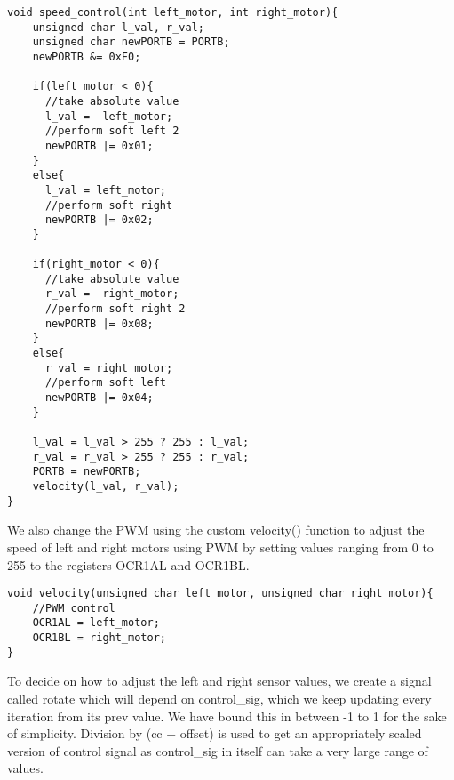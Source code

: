 \documentclass{article}
\begin{document}

\begin{tcolorbox}[title={Code for \texttt{speed\_control()} function}]
\begin{lstlisting}
void speed_control(int left_motor, int right_motor){
    unsigned char l_val, r_val;
    unsigned char newPORTB = PORTB;
    newPORTB &= 0xF0;
    
    if(left_motor < 0){
      //take absolute value
      l_val = -left_motor;
      //perform soft left 2
      newPORTB |= 0x01;
    }
    else{
      l_val = left_motor;
      //perform soft right
      newPORTB |= 0x02;
    }
    
    if(right_motor < 0){
      //take absolute value
      r_val = -right_motor;
      //perform soft right 2
      newPORTB |= 0x08;
    }
    else{
      r_val = right_motor;
      //perform soft left
      newPORTB |= 0x04;
    }
    
    l_val = l_val > 255 ? 255 : l_val;
    r_val = r_val > 255 ? 255 : r_val;
    PORTB = newPORTB;
    velocity(l_val, r_val);
}
\end{lstlisting}
\end{tcolorbox}

We also change the PWM using the custom velocity() function to adjust the speed of left and right motors using PWM by setting values ranging from 0 to 255 to the registers OCR1AL and OCR1BL.

\begin{tcolorbox}[title={Code for PWM \texttt{velocity()} function}]
\begin{lstlisting}
void velocity(unsigned char left_motor, unsigned char right_motor){
    //PWM control
    OCR1AL = left_motor;
    OCR1BL = right_motor;
}
\end{lstlisting}
\end{tcolorbox}

To decide on how to adjust the left and right sensor values, we create a signal called rotate which will depend on control\_sig, which we keep updating every iteration from its prev value. We have bound this in between -1 to 1 for the sake of simplicity. Division by (cc + offset) is used to get an appropriately scaled version of control signal as control\_sig in itself can take a very large range of values.
\end{document}
